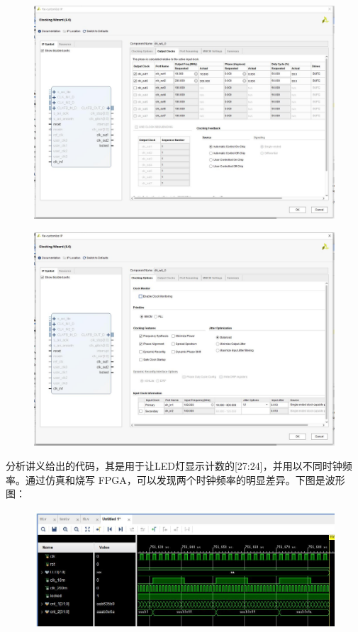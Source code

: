 \documentclass[UTF8]{article}
\begin{document}
	\begin{figure}[H]
		\begin{minipage}[H]{0.45\linewidth}
			\centering
			\includegraphics[scale=0.16]{s4_2.jpg}
			\label{s4_2}
		\end{minipage}
		\qquad
		\begin{minipage}[H]{0.45\linewidth}
			\centering
			\includegraphics[scale=0.16]{s4_3.jpg}
			\label{s4_3}
		\end{minipage}
	\end{figure}
	分析讲义给出的代码，其是用于让LED灯显示计数的[27:24]，并用以不同时钟频率。通过仿真和烧写 FPGA，可以发现两个时钟频率的明显差异。下图是波形图：\par
	\begin{figure}[H]
		\centering
		\includegraphics[scale=0.5]{s4_4.jpg}
		\label{s4_4}
	\end{figure}
\end{document}

